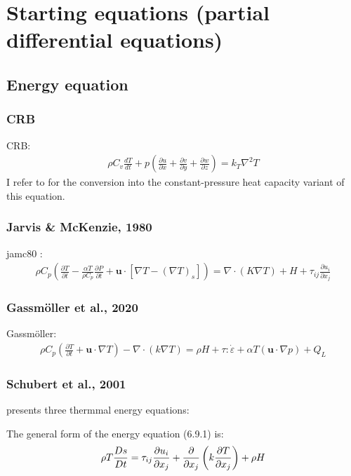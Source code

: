 \documentclass[document.tex]{subfiles}
\begin{document}
\section{Starting equations (partial differential equations)}
\subsection{Energy equation}
\subsubsection{CRB}
CRB: \cite{cube11}
\begin{align}
\rho	  C_v \frac{dT}{dt} + p\left( \frac{\partial u}{\partial x} + \frac{\partial v}{\partial y} + \frac{\partial w}{\partial z}\right) = k_T \nabla ^2 T
\end{align}
I refer to \cite{scto01} for the conversion into the constant-pressure heat capacity variant of this equation. 
\subsubsection{Jarvis \& McKenzie, 1980}
jamc80 \cite{jamc80}:
\begin{align}
\rho C_p\left(\frac{\partial T}{\partial t}-\frac{\alpha T}{\rho C_p} \frac{\partial P}{\partial t} + \textbf{u} \cdot [\nabla T - (\nabla T)_s]\right) = \nabla \cdot (K\nabla T) + H +\tau	_{ij} \frac{\partial u_i}{\partial	x_j}
\end{align}	

\subsubsection{Gassmöller et al., 2020}
Gassmöller: \cite{gada20}
\begin{align}
\rho C_p \left(\frac{\partial T}{\partial t} + \textbf{u} \cdot \nabla T\right) - \nabla \cdot(k\nabla T) = \rho	H +\tau	: \dot{\varepsilon} + \alpha	T(\textbf{u} \cdot \nabla p) + Q_L
\end{align}

\subsubsection{Schubert et al., 2001}
\cite{scto01} presents three thermmal energy equations: 

The general form of the energy equation (6.9.1) is:
\begin{equation}
    \rho T \frac{D s}{D t} = \tau_{ij}\pdv{u_i}{x_j} + \pdv{}{x_j}\left(k\pdv{T}{x_j}\right) + \rho H 
\end{equation}
\end{document}
